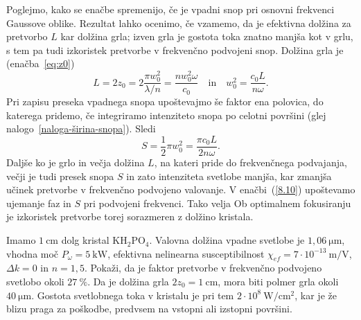 Poglejmo, kako se enačbe spremenijo, če je vpadni snop pri osnovni 
frekvenci Gaussove oblike. 
Rezultat lahko ocenimo, če vzamemo, da je
efektivna dolžina za pretvorbo $L$ kar dolžina grla; izven grla je 
gostota toka znatno manjša kot v grlu, s tem pa tudi izkoristek pretvorbe v 
frekvenčno podvojeni snop.
Dolžina grla je (enačba~\ref{eq:z0})
\begin{equation}
L=2z_{0}=2\frac{\pi w_{0}^{2}}{\lambda/n} = \frac{n w_0^2 \omega}{c_0}  \quad \mathrm{in} \quad 
w_{0}^{2} = \frac{c_0 L}{n \omega}.
\label{SHGG}
\end{equation}
Pri zapisu preseka vpadnega snopa upoštevajmo še faktor ena polovica, do katerega 
pridemo, če integriramo intenziteto 
snopa po celotni površini (glej nalogo~\ref{naloga-širina-snopa}). Sledi
\begin{equation}
S=\frac{1}{2}\pi w_{0}^{2} = \frac{\pi c_0 L}{2 n \omega}.
\end{equation}
Daljše ko je grlo in večja dolžina $L$, na kateri pride do frekvenčnega podvajanja, 
večji je tudi presek snopa $S$ in zato intenziteta svetlobe manjša, kar zmanjša
učinek pretvorbe v frekvenčno podvojeno valovanje.
V enačbi~(\ref{8.10}) upoštevamo ujemanje faz in $S$ pri podvojeni frekvenci. Tako velja 
Ob optimalnem fokusiranju je izkoristek pretvorbe torej sorazmeren z dolžino kristala.
\begin{definition}
Imamo $1~\si{\centi\metre}$ dolg kristal KH$_{2}$PO$_{4}$. Valovna dolžina vpadne svetlobe 
je $1,06~\si{\micro\metre}$, vhodna moč $P_\omega = 5~\si{\kilo\watt}$, efektivna nelinearna susceptibilnost
$\chi_{ef}=7\cdot10^{-13}~\si{\metre/\volt}$, $\Delta k=0$ in $n=1,5$. Pokaži, da je
faktor pretvorbe v frekvenčno podvojeno svetlobo okoli $27~\%$.
Da je dolžina grla $2z_{0}=1~\si{\centi\metre}$, mora biti polmer
grla okoli $40~\si{\micro\metre}$. Gostota svetlobnega toka v kristalu je pri
tem $2\cdot10^{8}~\si{\watt/\centi\metre^{2}}$, kar je že blizu praga za poškodbe,
predvsem na vstopni ali izstopni površini. 
\end{definition}

